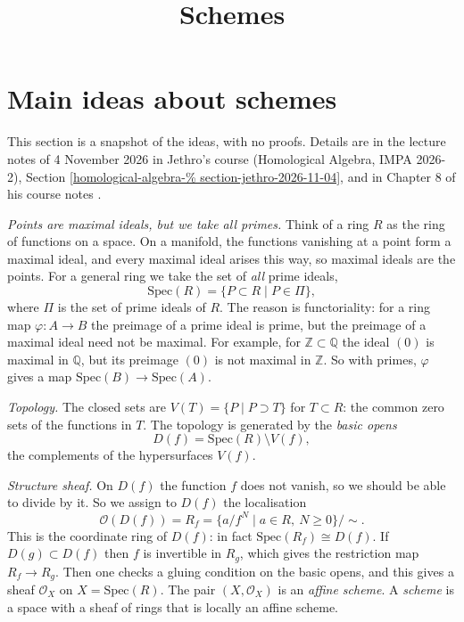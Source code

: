 



\title{Schemes}
\maketitle

\label{section-phantom}

\tableofcontents

\section{Main ideas about schemes}
\label{section-main-ideas-about-schemes}

This section is a snapshot of the ideas, with
no proofs. Details are in the lecture notes
of 4 November 2026 in Jethro's course
(Homological Algebra, IMPA 2026-2), Section
\ref{homological-algebra-%
section-jethro-2026-11-04},
and in Chapter 8 of his course notes
\cite{vanEkerenHomologicalAlgebra2026}.

\textit{Points are maximal ideals, but we
take all primes.} Think of a ring $R$ as the
ring of functions on a space. On a manifold,
the functions vanishing at a point form a
maximal ideal, and every maximal ideal arises
this way, so maximal ideals are the points.
For a general ring we take the set of
\textit{all} prime ideals,
$$
\mathrm{Spec}(R)=\{P\subset R \mid P\in\Pi\},
$$
where $\Pi$ is the set of prime ideals of
$R$. The reason is functoriality: for a ring
map $\varphi\colon A\to B$ the preimage of a
prime ideal is prime, but the preimage of a
maximal ideal need not be maximal. For
example, for $\mathbb{Z}\subset\mathbb{Q}$
the ideal $(0)$ is maximal in $\mathbb{Q}$,
but its preimage $(0)$ is not maximal in
$\mathbb{Z}$. So with primes, $\varphi$ gives
a map $\mathrm{Spec}(B)\to\mathrm{Spec}(A)$.

\textit{Topology.} The closed sets are
$V(T)=\{P \mid P\supset T\}$ for $T\subset
R$: the common zero sets of the functions in
$T$. The topology is generated by the
\textit{basic opens}
$$
D(f)=\mathrm{Spec}(R)\setminus V(f),
$$
the complements of the hypersurfaces $V(f)$.

\textit{Structure sheaf.} On $D(f)$ the
function $f$ does not vanish, so we should be
able to divide by it. So we assign to $D(f)$
the localisation
$$
\mathcal{O}(D(f))=R_f
=\{a/f^N \mid a\in R,\ N\geq 0\}/\sim .
$$
This is the coordinate ring of $D(f)$: in
fact $\mathrm{Spec}(R_f)\cong D(f)$. If
$D(g)\subset D(f)$ then $f$ is invertible in
$R_g$, which gives the restriction map
$R_f\to R_g$. Then one checks a gluing
condition on the basic opens, and this gives
a sheaf $\mathcal{O}_X$ on
$X=\mathrm{Spec}(R)$. The pair
$(X,\mathcal{O}_X)$ is an \textit{affine
scheme}. A \textit{scheme} is a space with a
sheaf of rings that is locally an affine
scheme.


